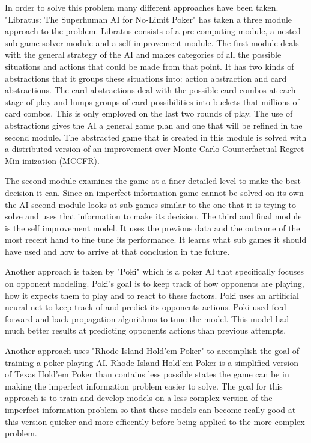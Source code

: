 In order to solve this problem many different approaches have been taken. "Libratus: The Superhuman AI for No-Limit Poker" has taken a three module approach to the problem\cite{brown2017libratus}. Libratus consists of a pre-computing module, a nested sub-game solver module and a self improvement module. The first module deals with the general strategy of the AI and makes categories of all the possible situations and actions that could be made from that point. It has two kinds of abstractions that it groups these situations into: action abstraction and card abstractions\cite{brown2017libratus}. The card abstractions deal with the possible card combos at each stage of play and lumps groups of card possibilities into buckets that millions of card combos. This is only employed on the last two rounds of play\cite{brown2017libratus}. The use of abstractions gives the AI a general game plan and one that will be refined in the second module. The abstracted game that is created in this module is solved with a distributed version of an improvement over Monte Carlo Counterfactual Regret Min-imization (MCCFR)\cite{brown2017libratus}.

The second module examines the game at a finer detailed level to make the best decision it can. Since an imperfect information game cannot be solved on its own the AI second module looks at sub games similar to the one that it is trying to solve and uses that information to make its decision\cite{brown2017libratus}. The third and final module is the self improvement model. It uses the previous data and the outcome of the most recent hand to fine tune its performance. It learns what sub games it should have used and how to arrive at that conclusion in the future\cite{brown2017libratus}.

Another approach is taken by "Poki" which is a poker AI that specifically focuses on opponent modeling\cite{davidson2000improved}. Poki's goal is to keep track of how opponents are playing, how it expects them to play and to react to these factors. Poki uses an artificial neural net to keep track of and predict its opponents actions. Poki used feed-forward and back propagation algorithms to tune the model. This model had much better results at predicting opponents actions than previous attempts\cite{davidson2000improved}.

Another approach uses "Rhode Island Hold’em Poker" to accomplish the goal of training a poker playing AI. Rhode Island Hold'em Poker is a simplified version of Texas Hold'em Poker than contains less possible states the game can be in making the imperfect information problem easier to solve\cite{gilpin2005optimal}. The goal for this approach is to train and develop models on a less complex version of the imperfect information problem so that these models can become really good at this version quicker and more efficently before being applied to the more complex problem\cite{gilpin2005optimal}.


